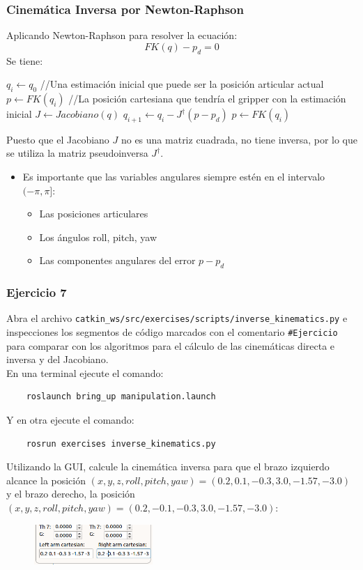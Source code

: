 \begin{frame}\frametitle{Cinemática Inversa por Newton-Raphson}
  Aplicando Newton-Raphson para resolver la ecuación:
  \[FK(q) - p_d = 0\]
  Se tiene:
  \begin{algorithm}[H]
    \DontPrintSemicolon
    $q_i \leftarrow q_0$ //Una estimación inicial que puede ser la posición articular actual\;
    $p \leftarrow FK(q_i)$ //La posición cartesiana que tendría el gripper con la estimación inicial\;
    {
      $J \leftarrow Jacobiano(q)$     \;
      $q_{i+1} \leftarrow q_i - J^\dagger (p - p_d)$\;
      $p \leftarrow FK(q_i)$ 
    }
  \end{algorithm}
  Puesto que el Jacobiano $J$ no es una matriz cuadrada, no tiene inversa, por lo que se utiliza la matriz pseudoinversa $J^\dagger$. 
  \begin{itemize}
  \item Es importante que las variables angulares siempre estén en el intervalo $(-\pi, \pi]$:
    \begin{itemize}
    \item Las posiciones articulares
    \item Los ángulos roll, pitch, yaw
    \item Las componentes angulares del error $p - p_d$
    \end{itemize}
  \end{itemize}
\end{frame}

\begin{frame}[containsverbatim]\frametitle{Ejercicio 7}
  Abra el archivo \texttt{catkin\_ws/src/exercises/scripts/inverse\_kinematics.py} e inspecciones los segmentos de código marcados con el comentario \texttt{\#Ejercicio} para comparar con los algoritmos para el cálculo de las cinemáticas directa e inversa y del Jacobiano.\\
  En una terminal ejecute el comando:
  \begin{lstlisting}
    roslaunch bring_up manipulation.launch
  \end{lstlisting}
  Y en otra ejecute el comando:
  \begin{lstlisting}
    rosrun exercises inverse_kinematics.py
  \end{lstlisting}
  Utilizando la GUI, calcule la cinemática inversa para que el brazo izquierdo alcance la posición $(x,y,z,roll, pitch, yaw) = (0.2, 0.1, -0.3, 3.0, -1.57, -3.0)$ y el brazo derecho, la posición $(x,y,z,roll, pitch, yaw) = (0.2, -0.1, -0.3, 3.0, -1.57, -3.0)$:
  \begin{figure}
    \centering
    \includegraphics[width=0.4\textwidth]{Figures/Exercise7Gui.png}
  \end{figure}
\end{frame}

